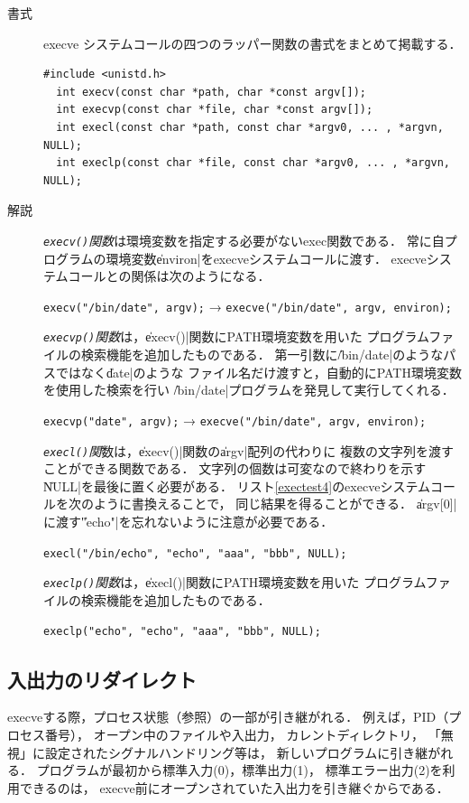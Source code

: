 \begin{description}
\item[書式]
  execve システムコールの四つのラッパー関数の書式をまとめて掲載する．
\begin{lstlisting}[numbers=none]
  #include <unistd.h>
  int execv(const char *path, char *const argv[]);
  int execvp(const char *file, char *const argv[]);
  int execl(const char *path, const char *argv0, ... , *argvn, NULL);
  int execlp(const char *file, const char *argv0, ... , *argvn, NULL);
\end{lstlisting}

\item [解説]
  \emph{\texttt{execv()}関数}は環境変数を指定する必要がないexec関数である．
  常に自プログラムの環境変数\|environ|をexecveシステムコールに渡す．
  execveシステムコールとの関係は次のようになる．

  \centerline{\texttt{execv("/bin/date", argv);}
    →  \texttt{execve("/bin/date", argv, environ);}}

  \emph{\texttt{execvp()}関数}は，\|execv()|関数にPATH環境変数を用いた
  プログラムファイルの検索機能を追加したものである．
  第一引数に\|/bin/date|のようなパスではなく\|date|のような
  ファイル名だけ渡すと，自動的にPATH環境変数を使用した検索を行い
  \|/bin/date|プログラムを発見して実行してくれる．
  
  \centerline{\texttt{execvp("date", argv);}
    →  \texttt{execve("/bin/date", argv, environ);}}

  \emph{\texttt{execl()}関}数は，\|execv()|関数の\|argv|配列の代わりに
  複数の文字列を渡すことができる関数である．
  文字列の個数は可変なので終わりを示す\| NULL|を最後に置く必要がある．
  リスト\ref{exectest4}のexecveシステムコールを次のように書換えることで，
  同じ結果を得ることができる．
  \|argv[0]|に渡す\|"echo"|を忘れないように注意が必要である．

  \centerline{\texttt{execl("/bin/echo", "echo", "aaa", "bbb", NULL);}}

  \emph{\texttt{execlp()}関数}は，\|execl()|関数にPATH環境変数を用いた
  プログラムファイルの検索機能を追加したものである．

  \centerline{\texttt{execlp("echo", "echo", "aaa", "bbb", NULL);}}

\end{description}

\subsection{入出力のリダイレクト}
execveする際，プロセス状態（参照）の一部が引き継がれる．
例えば，PID（プロセス番号），
オープン中のファイルや入出力，
カレントディレクトリ，
「無視」に設定されたシグナルハンドリング等は，
新しいプログラムに引き継がれる．
プログラムが最初から標準入力(0)，標準出力(1)，
標準エラー出力(2)を利用できるのは，
execve前にオープンされていた入出力を引き継ぐからである．

